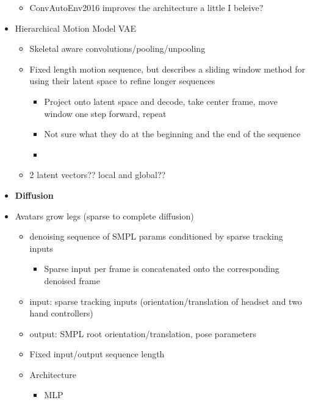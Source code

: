 \begin{itemize}
\begin{itemize}
        \item ConvAutoEnv2016 \cite{ConvAutoEnv2016} improves the architecture a little I beleive?
    \end{itemize}
    \item Hierarchical Motion Model VAE \cite{HierarchicalMotionVAE}
    \begin{itemize}
        \item Skeletal aware convolutions/pooling/unpooling
        \item Fixed length motion sequence, but describes a sliding window method for using their latent space to refine longer sequences 
        \begin{itemize}
            \item Project onto latent space and decode, take center frame, move window one step forward, repeat
            \item Not sure what they do at the beginning and the end of the sequence
            \item 
        \end{itemize}
        \item 2 latent vectors?? local and global??
    \end{itemize}

    \item \textbf{Diffusion}
    \item Avatars grow legs (sparse to complete diffusion) \cite{AvatarsGrowLegs}
    \begin{itemize}
        \item denoising sequence of SMPL params conditioned by sparse tracking inputs
        \begin{itemize}
            \item Sparse input per frame is concatenated onto the corresponding denoised frame
        \end{itemize}
        \item input: sparse tracking inputs (orientation/translation of headset and two hand controllers)
        \item output: SMPL root orientation/translation, pose parameters
        \item Fixed input/output sequence length
        \item Architecture
        \begin{itemize}
            \item MLP
        \end{itemize}
    \end{itemize}


\end{itemize}
